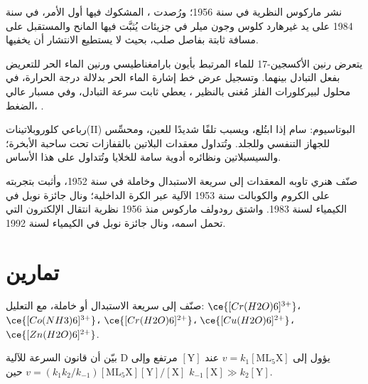 نشر ماركوس النظرية في سنة 1956؛ ورُصدت ، المشكوك فيها أول الأمر،
في سنة 1984 على يد غيرهارد كلوس وجون ميلر في جزيئات يُثبَّت فيها المانح 
والمستقبل على مسافة ثابتة بفاصل صلب، بحيث لا يستطيع الانتشار
أن يخفيها.

\begin{inthelab}
يتعرض رنين الأكسجين-17 للماء المرتبط بأيون بارامغناطيسي ورنين
الماء الحر للتعريض بفعل التبادل بينهما. وتسجيل عرض خط
إشارة الماء الحر بدلالة درجة الحرارة، في محلول لبيركلورات الفلز
مُغنى بالنظير ، يعطي ثابت سرعة التبادل، وفي مسبار عالي الضغط،
.
\end{inthelab}

\begin{safety}{}
رباعي كلوروبلاتينات(II) البوتاسيوم: سام إذا ابتُلع، ويسبب تلفًا شديدًا
للعين، ومحسِّس للجهاز التنفسي وللجلد. وتُتداول معقدات البلاتين
بالقفازات تحت ساحبة الأبخرة؛ والسيسبلاتين ونظائره أدوية سامة للخلايا
وتُتداول على هذا الأساس.
\end{safety}

\begin{history}
صنّف هنري تاوبه المعقدات إلى سريعة الاستبدال وخاملة في سنة 1952، وأثبت بتجربته
على الكروم والكوبالت سنة 1953 الآلية عبر الكرة الداخلية؛ 
ونال جائزة نوبل في الكيمياء لسنة 1983. واشتق رودولف ماركوس منذ 1956
نظرية انتقال الإلكترون التي تحمل اسمه، ونال جائزة نوبل
في الكيمياء لسنة 1992.
\end{history}

\section{تمارين}

\begin{exercise}[$\star$]\label{exo:b3:complex-mechanisms:1}
صنّف إلى سريعة الاستبدال أو خاملة، مع التعليل: $\ce{[Cr(H2O)6]^{3+}}$، $\ce{[Co(NH3)6]^{3+}}$، $\ce{[Cr(H2O)6]^{2+}}$،
$\ce{[Cu(H2O)6]^{2+}}$، $\ce{[Zn(H2O)6]^{2+}}$.
\end{exercise}

\begin{exercise}[$\star$]\label{exo:b3:complex-mechanisms:2}
بيّن أن قانون السرعة للآلية D يؤول إلى $v = k_1[\mathrm{ML_5X}]$ عند $[\mathrm Y]$ مرتفع وإلى $v = (k_1k_2/k_{-1})
[\mathrm{ML_5X}][\mathrm Y]/[\mathrm X]$ حين $k_{-1}[\mathrm X] \gg k_2[\mathrm Y]$.
\end{exercise}

